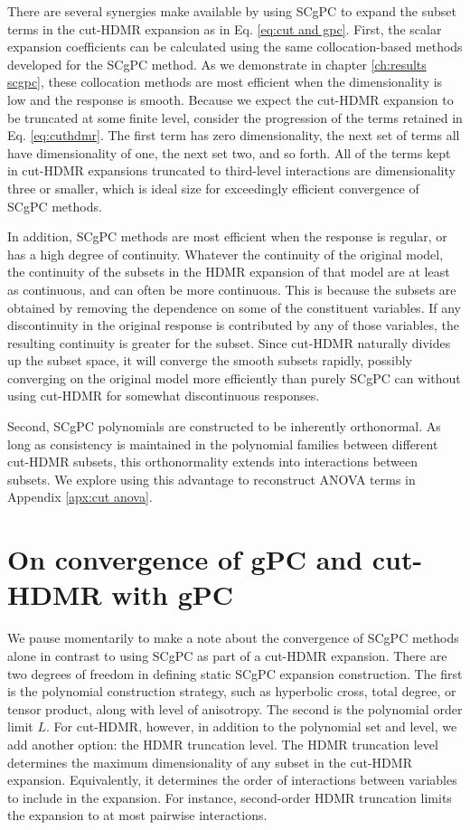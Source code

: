 There are several synergies make available by using SCgPC to expand the subset terms in
the cut-HDMR expansion as in Eq. \ref{eq:cut and gpc}.  First, the scalar expansion coefficients can be calculated using the same
collocation-based methods developed for the SCgPC method.  
As we demonstrate in chapter \ref{ch:results scgpc},
these collocation methods are most efficient when the dimensionality is low and the response is smooth.
Because we expect the cut-HDMR expansion to be truncated at some finite level, consider the progression of the
terms retained in Eq. \ref{eq:cuthdmr}. The first term has zero dimensionality, the next set of terms all have
dimensionality of one, the next set two, and so forth.  All of the terms kept in cut-HDMR expansions
truncated to third-level interactions are dimensionality three or smaller, which is ideal size for
exceedingly efficient convergence of SCgPC methods.

In
addition, SCgPC methods are most efficient when the response is regular, or has a high degree
of continuity.  Whatever the
continuity of the original model, the continuity of the subsets in the HDMR expansion of that model are at
least as continuous, and can often be more continuous.  This is because the subsets are obtained by removing the 
dependence on some of the
constituent variables.  If any discontinuity in the original response is contributed by any of those variables,
the resulting continuity is greater for the subset.
Since cut-HDMR naturally divides up the subset space, it will
converge the smooth subsets rapidly, possibly converging on the original model more efficiently than purely
SCgPC can without using cut-HDMR for somewhat discontinuous responses.

Second, SCgPC polynomials are constructed to be inherently orthonormal.  As long as
consistency is maintained in the polynomial families between different cut-HDMR subsets, this orthonormality
extends into interactions between subsets.  We explore using this advantage to reconstruct ANOVA terms
in Appendix \ref{apx:cut anova}.

\section{On convergence of gPC and cut-HDMR with gPC}\label{sec:conv gpc hdmr}
We pause momentarily to make a note about the convergence of SCgPC
methods alone in contrast to using SCgPC as part of a cut-HDMR expansion.  There are two degrees of freedom in
defining static SCgPC expansion construction.
The first is the polynomial
construction strategy, such as hyperbolic cross, total degree, or tensor product, along with level of
anisotropy.  The second is the polynomial order limit $L$.  For cut-HDMR, however, in addition to the
polynomial set and level, we add another option: the HDMR truncation level.  The HDMR truncation level
determines the maximum dimensionality of any subset in the cut-HDMR expansion.  Equivalently, it determines
the order of interactions between variables to include in the expansion.  For instance, second-order HDMR
truncation limits the expansion to at most pairwise interactions.

